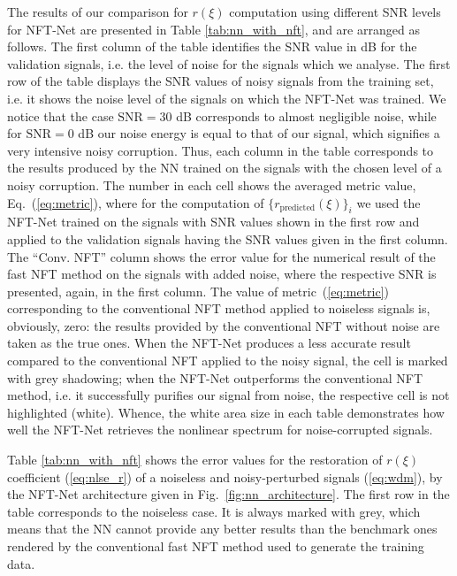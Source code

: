 The results of our comparison for $r(\xi)$ computation using different SNR levels for NFT-Net are presented in Table \ref{tab:nn_with_nft}, and are arranged as follows. The first column of the table identifies the SNR value in dB for the validation signals, i.e. the level of noise for the signals which we analyse. The first row of the table displays the SNR values of noisy signals from the training set, i.e. it shows the noise level of the signals on which the NFT-Net was trained. We notice that the case $\text{SNR}=30$ dB corresponds to almost negligible noise, while for $\text{SNR}=0$ dB our noise energy is equal to that of our signal, which signifies a very intensive noisy corruption. Thus, each column in the table corresponds to the results produced by the NN trained on the signals with the chosen level of a noisy corruption.
The number in each cell shows the averaged metric value, Eq.~(\ref{eq:metric}), where for the computation of $\{r_{\text{predicted}}(\xi)\}_{i}$ we used the NFT-Net trained on the signals with SNR values shown in the first row and applied to the validation signals having the SNR values given in the first column. The ``Conv. NFT'' column shows the error value for the numerical result of the fast NFT method on the signals with added noise, where the respective SNR is presented, again, in the first column. The value of metric~(\ref{eq:metric}) corresponding to the conventional NFT method applied to noiseless signals is, obviously, zero: the results provided by the conventional NFT without noise are taken as the true ones. 
When the NFT-Net produces a less accurate result compared to the conventional NFT applied to the noisy signal, the cell is marked with grey shadowing; when the NFT-Net outperforms the conventional NFT method, i.e. it successfully purifies our signal from noise, the respective cell is not highlighted (white). 
Whence, the white area size in each table demonstrates how well the NFT-Net retrieves the nonlinear spectrum for noise-corrupted signals.




Table \ref{tab:nn_with_nft} shows the error values for the restoration of $r(\xi)$ coefficient (\ref{eq:nlse_r}) of a noiseless and noisy-perturbed signals (\ref{eq:wdm}), by the NFT-Net architecture given in Fig.~\ref{fig:nn_architecture}. The first row in the table corresponds to the noiseless case. It is always marked with grey, which means that the NN cannot provide any better results than the benchmark ones rendered by the conventional fast NFT method used to generate the training data. 

